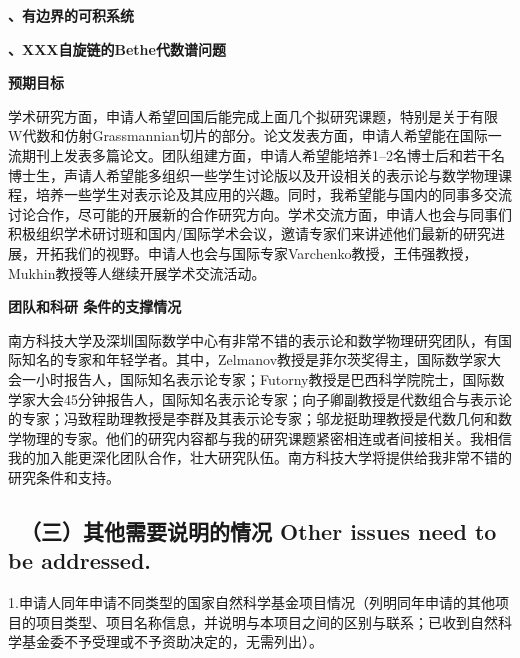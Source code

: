 \documentclass[12pt,UTF8,AutoFakeBold=4,a4paper]{ctexart}
\begin{document}
\medskip

\textbf{、有边界的可积系统}




\medskip

\textbf{、XXX自旋链的Bethe代数谱问题}


\medskip

\textbf{\sihao 预期目标}

学术研究方面，申请人希望回国后能完成上面几个拟研究课题，特别是关于有限W代数和仿射Grassmannian切片的部分。论文发表方面，申请人希望能在国际一流期刊上发表多篇论文。团队组建方面，申请人希望能培养1--2名博士后和若干名博士生，声请人希望能多组织一些学生讨论版以及开设相关的表示论与数学物理课程，培养一些学生对表示论及其应用的兴趣。同时，我希望能与国内的同事多交流讨论合作，尽可能的开展新的合作研究方向。学术交流方面，申请人也会与同事们积极组织学术研讨班和国内/国际学术会议，邀请专家们来讲述他们最新的研究进展，开拓我们的视野。申请人也会与国际专家Varchenko教授，王伟强教授，Mukhin教授等人继续开展学术交流活动。

\medskip

\textbf{\sihao 团队和科研 条件的支撑情况}

南方科技大学及深圳国际数学中心有非常不错的表示论和数学物理研究团队，有国际知名的专家和年轻学者。其中，Zelmanov教授是菲尔茨奖得主，国际数学家大会一小时报告人，国际知名表示论专家；Futorny教授是巴西科学院院士，国际数学家大会45分钟报告人，国际知名表示论专家；向子卿副教授是代数组合与表示论的专家；冯致程助理教授是李群及其表示论专家；邬龙挺助理教授是代数几何和数学物理的专家。他们的研究内容都与我的研究课题紧密相连或者间接相关。我相信我的加入能更深化团队合作，壮大研究队伍。南方科技大学将提供给我非常不错的研究条件和支持。

\bigskip

{\color{MsBlue} \subsection{\sihao \kaishu \qquad \ \bfseries（三）其他需要说明的情况 
\xiaosihao {} Other issues need to be addressed.}}
%

\bigskip

{\sihao \color{MsBlue} \kaishu 1.申请人同年申请不同类型的国家自然科学基金项目情况（列明同年申请的其他项目的项目类型、项目名称信息，并说明与本项目之间的区别与联系；已收到自然科学基金委不予受理或不予资助决定的，无需列出）。}
\end{document}
